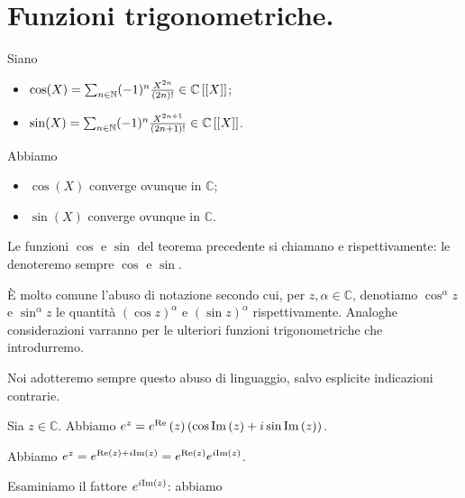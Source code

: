 \section{Funzioni trigonometriche.}
\label{FunzioniNotevoli_FunzioniTrigonometriche}
\begin{Theorem}
	Siano
	\begin{itemize}
		\item $\cos(X)
          = \sum_{n \in \mathbb{N}} (-1)^n \frac{X^{2n}}{(2n)!}
          \in \mathbb{C} \left [ \left [ X \right ] \right ]$;
		\item $\sin(X)
          = \sum_{n \in \mathbb{N}} (-1)^n \frac{X^{2n + 1}}{(2n + 1)!}
          \in \mathbb{C} \left [ \left [ X \right ] \right ]$.
	\end{itemize}
	Abbiamo
	\begin{itemize}
		\item $\cos(X)$ converge ovunque in $\mathbb{C}$;
		\item $\sin(X)$ converge ovunque in $\mathbb{C}$.
	\end{itemize}
\end{Theorem}
\begin{Definition}
	Le funzioni $\cos$ e $\sin$ del teorema precedente si chiamano
   e  rispettivamente: le denoteremo sempre
  $\cos$ e $\sin$.
\end{Definition}
\par \`E molto comune l'abuso di notazione secondo cui, per
$z, \alpha \in \mathbb{C}$, denotiamo $\cos^\alpha{z}$ e
$\sin^\alpha{z}$ le quantit\`a $(\cos{z})^\alpha$ e $(\sin{z})^\alpha$
rispettivamente. Analoghe considerazioni varranno per le ulteriori
funzioni trigonometriche che introdurremo.
\par Noi adotteremo sempre questo abuso di linguaggio, salvo esplicite
indicazioni contrarie.
\begin{Theorem}
	Sia $z \in \mathbb{C}$. Abbiamo
  $e^z
  = e^\text{Re} \left ( z \right ) (\cos \text{Im} \left ( z \right ) + i \sin \text{Im} \left ( z \right ))$.
\end{Theorem}
\Proof Abbiamo
$e^z
= e^{\text{Re} \left ( z \right ) + i \text{Im} \left ( z \right )}
= e^{\text{Re} \left ( z \right )} e^{i \text{Im} \left ( z \right )}$.
\par Esaminiamo il fattore $e^{i \text{Im} \left ( z \right )}$: abbiamo
